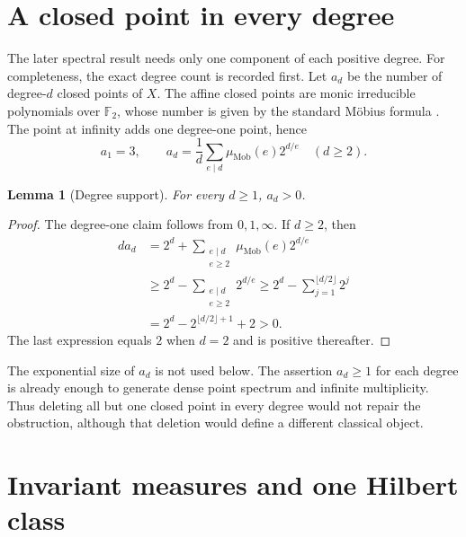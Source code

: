 \documentclass[11pt]{article}
\newtheorem{lemma}[theorem]{Lemma}
\theoremstyle{definition}
\theoremstyle{remark}
\newcommand{\F}{\mathbb{F}}
\newcommand{\e}{\mathrm{e}}
\begin{document}
\section{A closed point in every degree}
\label{sec:degrees}

The later spectral result needs only one component of each positive degree.
For completeness, the exact degree count is recorded first.  Let \(a_d\) be
the number of degree-\(d\) closed points of \(X\).  The affine closed points
are monic irreducible polynomials over \(\F_2\), whose number is given by the
standard M\"obius formula \citep[Thm.~1.3.6]{NiederreiterXing2009}.  The point
at infinity adds one degree-one point, hence
\begin{equation}
 a_1=3,
 \qquad
 a_d=\frac1d\sum_{e\mid d}\mu_{\mathrm{Mob}}(e)2^{d/e}
 \quad(d\geq2).
 \label{eq:closed-point-count}
\end{equation}

\begin{lemma}[Degree support]
\label{lem:degree-support}
For every \(d\geq1\), \(a_d>0\).
\end{lemma}

\begin{proof}
The degree-one claim follows from \(0,1,\infty\).  If \(d\geq2\), then
\begin{align*}
 d a_d
 &=2^d+\sum_{\substack{e\mid d\\e\geq2}}
       \mu_{\mathrm{Mob}}(e)2^{d/e}\\
 &\geq2^d-\sum_{\substack{e\mid d\\e\geq2}}2^{d/e}
 \geq2^d-\sum_{j=1}^{\lfloor d/2\rfloor}2^j\\
 &=2^d-2^{\lfloor d/2\rfloor+1}+2>0.
\end{align*}
The last expression equals \(2\) when \(d=2\) and is positive thereafter.
\end{proof}

The exponential size of \(a_d\) is not used below.  The assertion
\(a_d\geq1\) for each degree is already enough to generate dense point
spectrum and infinite multiplicity.  Thus deleting all but one closed point
in every degree would not repair the obstruction, although that deletion
would define a different classical object.

\section{Invariant measures and one Hilbert class}
\label{sec:measures}
\end{document}
